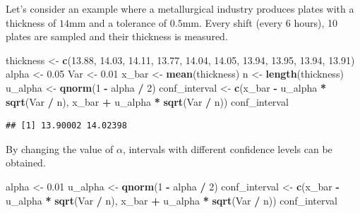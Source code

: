 \documentclass[
]{article}
\newenvironment{Shaded}{\begin{snugshade}}{\end{snugshade}}
\newcommand{\DecValTok}[1]{\textcolor[rgb]{0.00,0.00,0.81}{#1}}
\newcommand{\FloatTok}[1]{\textcolor[rgb]{0.00,0.00,0.81}{#1}}
\newcommand{\FunctionTok}[1]{\textcolor[rgb]{0.13,0.29,0.53}{\textbf{#1}}}
\newcommand{\NormalTok}[1]{#1}
\newcommand{\OtherTok}[1]{\textcolor[rgb]{0.56,0.35,0.01}{#1}}
\newcommand{\SpecialCharTok}[1]{\textcolor[rgb]{0.81,0.36,0.00}{\textbf{#1}}}
\begin{document}
Let's consider an example where a metallurgical industry produces plates
with a thickness of \(14 \text{mm}\) and a tolerance of
\(0.5 \text{mm}\). Every shift (every 6 hours), 10 plates are sampled
and their thickness is measured.

\begin{Shaded}
\begin{Highlighting}[]
\NormalTok{thickness }\OtherTok{\textless{}{-}} \FunctionTok{c}\NormalTok{(}\FloatTok{13.88}\NormalTok{, }\FloatTok{14.03}\NormalTok{, }\FloatTok{14.11}\NormalTok{, }\FloatTok{13.77}\NormalTok{, }\FloatTok{14.04}\NormalTok{, }\FloatTok{14.05}\NormalTok{, }\FloatTok{13.94}\NormalTok{, }\FloatTok{13.95}\NormalTok{, }\FloatTok{13.94}\NormalTok{, }\FloatTok{13.91}\NormalTok{)}
\NormalTok{alpha }\OtherTok{\textless{}{-}} \FloatTok{0.05}
\NormalTok{Var }\OtherTok{\textless{}{-}} \FloatTok{0.01}
\NormalTok{x\_bar }\OtherTok{\textless{}{-}} \FunctionTok{mean}\NormalTok{(thickness)}
\NormalTok{n }\OtherTok{\textless{}{-}} \FunctionTok{length}\NormalTok{(thickness)}
\NormalTok{u\_alpha }\OtherTok{\textless{}{-}} \FunctionTok{qnorm}\NormalTok{(}\DecValTok{1} \SpecialCharTok{{-}}\NormalTok{ alpha }\SpecialCharTok{/} \DecValTok{2}\NormalTok{)}
\NormalTok{conf\_interval }\OtherTok{\textless{}{-}} \FunctionTok{c}\NormalTok{(x\_bar }\SpecialCharTok{{-}}\NormalTok{ u\_alpha }\SpecialCharTok{*} \FunctionTok{sqrt}\NormalTok{(Var }\SpecialCharTok{/}\NormalTok{ n), x\_bar }\SpecialCharTok{+}\NormalTok{ u\_alpha }\SpecialCharTok{*} \FunctionTok{sqrt}\NormalTok{(Var }\SpecialCharTok{/}\NormalTok{ n))}
\NormalTok{conf\_interval}
\end{Highlighting}
\end{Shaded}

\begin{verbatim}
## [1] 13.90002 14.02398
\end{verbatim}

By changing the value of \(\alpha\), intervals with different confidence
levels can be obtained.

\begin{Shaded}
\begin{Highlighting}[]
\NormalTok{alpha }\OtherTok{\textless{}{-}} \FloatTok{0.01}
\NormalTok{u\_alpha }\OtherTok{\textless{}{-}} \FunctionTok{qnorm}\NormalTok{(}\DecValTok{1} \SpecialCharTok{{-}}\NormalTok{ alpha }\SpecialCharTok{/} \DecValTok{2}\NormalTok{)}
\NormalTok{conf\_interval }\OtherTok{\textless{}{-}} \FunctionTok{c}\NormalTok{(x\_bar }\SpecialCharTok{{-}}\NormalTok{ u\_alpha }\SpecialCharTok{*} \FunctionTok{sqrt}\NormalTok{(Var }\SpecialCharTok{/}\NormalTok{ n), x\_bar }\SpecialCharTok{+}\NormalTok{ u\_alpha }\SpecialCharTok{*} \FunctionTok{sqrt}\NormalTok{(Var }\SpecialCharTok{/}\NormalTok{ n))}
\NormalTok{conf\_interval}
\end{Highlighting}
\end{Shaded}
\end{document}
